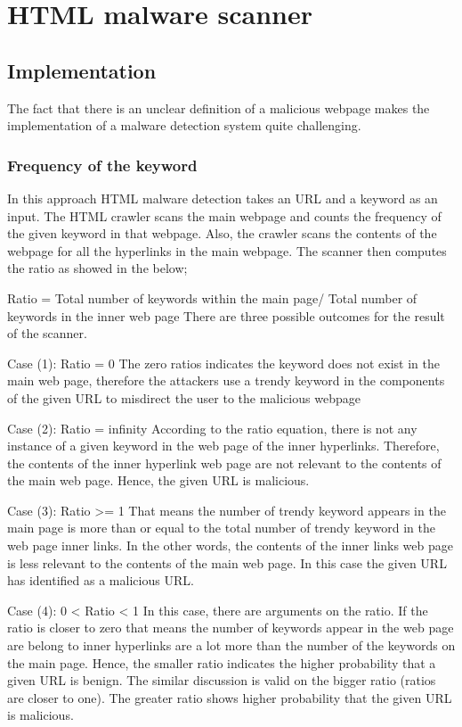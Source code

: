 \section{HTML malware scanner}

\subsection{Implementation}
The fact that there is an unclear definition of a malicious webpage makes the implementation of a malware detection system quite challenging. 	  
	

\subsubsection{Frequency of the keyword}

In this approach HTML malware detection takes an URL and a keyword as an input. The HTML crawler scans the main webpage and counts the frequency of the given keyword in that webpage. Also, the crawler scans the contents of the webpage for all the hyperlinks in the main webpage. The scanner then computes the ratio as showed in the below;

Ratio = Total number of keywords within the main page/ Total number of keywords in the inner web page 
There are three possible outcomes for the result of the scanner. 

Case (1): Ratio = 0
The zero ratios indicates the keyword does not exist in the main web page, therefore the attackers use a trendy keyword in the components of the given URL to misdirect the user to the malicious webpage

Case (2): Ratio = infinity
According to the ratio equation, there is not any instance of a given keyword in the web page of the inner hyperlinks. Therefore, the contents of the inner hyperlink web page are not relevant to the contents of the main web page. Hence, the given URL is malicious.

Case (3): Ratio >= 1
That means the number of trendy keyword appears in the main page is more than or equal to the total number of trendy keyword in the web page inner links. In the other words, the contents of the inner links web page is less relevant to the contents of the main web page. In this case the given URL has identified as a malicious URL. 

Case (4): 0 < Ratio < 1
In this case, there are arguments on the ratio. If the ratio is closer to zero that means the number of keywords appear in the web page are belong to inner hyperlinks are a lot more than the number of the keywords on the main page. Hence, the smaller ratio indicates the higher probability that a given URL is benign. The similar discussion is valid on the bigger ratio (ratios are closer to one). The greater ratio shows higher probability that the given URL is malicious. 

